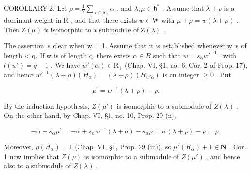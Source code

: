 COROLLARY 2. Let \(\rho = \frac{1}{2}\sum_{\alpha \in \mathrm{R}_{+}}\alpha\) , and \(\lambda, \mu \in \mathfrak{h}^*\) . Assume that \(\lambda + \rho\) is a dominant weight in \(\mathrm{R}\) , and that there exists \(w \in \mathrm{W}\) with \(\mu + \rho = w(\lambda + \rho)\) . Then \(\mathrm{Z}(\mu)\) is isomorphic to a submodule of \(\mathrm{Z}(\lambda)\) .

The assertion is clear when w = 1. Assume that it is established whenever w is of length \textless{} q. If w is of length q, there exists \(\alpha \in B\) such that \(w = s_{\alpha}w'^{-1}\) , with \(l(w') = q - 1\) . We have \(w'(\alpha) \in \mathrm{R}_{+}\) (Chap. VI, §1, no. 6, Cor. 2 of Prop. 17), and hence \(w'^{-1}(\lambda + \rho)(H_{\alpha}) = (\lambda + \rho)(H_{w'\alpha})\) is an integer \(\geq 0\) . Put

\[
\mu^ {\prime} = w ^ {- 1} (\lambda + \rho) - \rho .
\]

By the induction hypothesis, \(Z(\mu')\) is isomorphic to a submodule of \(Z(\lambda)\) . On the other hand, by Chap. VI, §1, no. 10, Prop. 29 (ii),

\[
- \alpha + s _ {\alpha} \mu^ {\prime} = - \alpha + s _ {\alpha} w ^ {- 1} (\lambda + \rho) - s _ {\alpha} \rho = w (\lambda + \rho) - \rho = \mu .
\]

Moreover, \(\rho(H_{\alpha}) = 1\) (Chap. VI, §1, Prop. 29 (iii)), so \(\mu'(H_{\alpha}) + 1 \in \mathbf{N}\) . Cor. 1 now implies that \(Z(\mu)\) is isomorphic to a submodule of \(Z(\mu')\) , and hence also to a submodule of \(Z(\lambda)\) .

